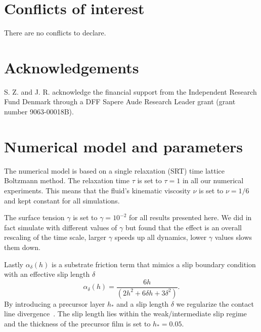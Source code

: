 \documentclass[twoside,twocolumn,9pt]{article}
\renewcommand{\refname}{Notes and references}
\begin{document}
\section*{Conflicts of interest}
There are no conflicts to declare.

\section*{Acknowledgements}
S. Z. and J. R. acknowledge the financial support from the Independent Research Fund Denmark through a DFF Sapere Aude Research Leader grant (grant number 9063-00018B).





\balance



\appendix
\section{Numerical model and parameters}\label{app:numerics}
The numerical model is based on a single relaxation (SRT) time lattice Boltzmann method. 
The relaxation time $\tau$ is set to $\tau = 1$ in all our numerical experiments. 
This means that the fluid's kinematic viscosity $\nu$ is set to $\nu = 1/6$ and kept constant for all simulations.  


The surface tension $\gamma$ is set to $\gamma = 10^{-2}$ for all results presented here.
We did in fact simulate with different values of $\gamma$ but found that the effect is an overall rescaling of the time scale, larger $\gamma$ speeds up all dynamics, lower $\gamma$ values slows them down.

Lastly $\alpha_{\delta}(h)$ is a substrate friction term that mimics a slip boundary condition with an effective slip length $\delta$
\begin{equation}\label{eq:alphafric_app}
\alpha_{\delta}(h) = \frac{6h}{(2 h^2 + 6 \delta h + 3 \delta^2)}.
\end{equation}
By introducing a precursor layer $h_{\ast}$ and a slip length $\delta$ we regularize the contact line divergence~\cite{huhHydrodynamicModelSteady1971}. 
The slip length lies within the weak/intermediate slip regime~\cite{peschkaSignaturesSlipDewetting2019,fetzerQuantifyingHydrodynamicSlip2007, munchLubricationModelsSmall2005} and the thickness of the precursor film is set to $h_{\ast} = 0.05$.
\end{document}
